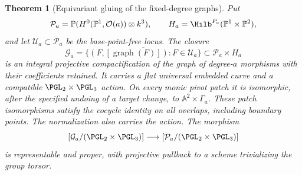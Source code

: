 \documentclass[11pt,reqno]{amsart}
\numberwithin{equation}{section}
\newtheorem{theorem}{Theorem}[section]
\theoremstyle{definition}\newtheorem{definition}[theorem]{Definition}
\theoremstyle{remark}\newtheorem{remark}[theorem]{Remark}
\newcommand{\Pj}{\mathbb P}\newcommand{\A}{\mathbb A}
\newcommand{\OO}{\mathcal O}\newcommand{\II}{\mathcal I}
\begin{document}
\begin{theorem}[Equivariant gluing of the fixed-degree graphs]
\label{thm:global-gluing-v169}
Put
\[
 \mathcal P_a=\Pj(H^0(\Pj^1,\OO(a))\otimes k^3),\qquad
 H_a=\Hilb^{P_a}(\Pj^1\times\Pj^2),
\]
and let $\mathcal U_a\subset\mathcal P_a$ be the base-point-free
locus. The closure
\[
 \mathcal G_a=\overline{\{(F,[\operatorname{graph}(F)]):
                                F\in\mathcal U_a\}}
                    \subset\mathcal P_a\times H_a
\]
is an integral projective compactification of the graph of degree-$a$
morphisms with their coefficients retained. It carries a flat universal
embedded curve and a compatible $\PGL_2\times\PGL_3$ action. On every
monic pivot patch it is isomorphic, after the specified undoing of a
target change, to $\A^2\times\Gamma_a$. These patch isomorphisms
satisfy the cocycle identity on all overlaps, including boundary points.
The normalization also carries the action. The morphism
\[
 [\mathcal G_a/(\PGL_2\times\PGL_3)]
       \longrightarrow[\mathcal P_a/(\PGL_2\times\PGL_3)]
\]
is representable and proper, with projective pullback to a scheme
trivializing the group torsor.
\end{theorem}
\end{document}
